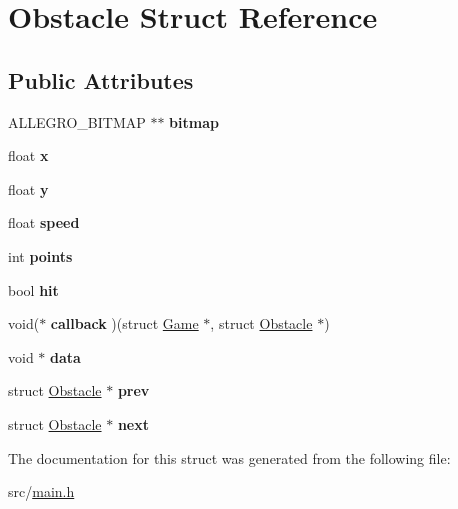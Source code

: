 \hypertarget{structObstacle}{\section{\-Obstacle \-Struct \-Reference}
\label{structObstacle}
}
\subsection*{\-Public \-Attributes}
\begin{DoxyCompactItemize}
\item 
\hypertarget{structObstacle_a1f35f88fe8f6d0664da082f82ae4b774}{\-A\-L\-L\-E\-G\-R\-O\-\_\-\-B\-I\-T\-M\-A\-P $\ast$$\ast$ {\bfseries bitmap}}\label{structObstacle_a1f35f88fe8f6d0664da082f82ae4b774}

\item 
\hypertarget{structObstacle_ad9cd25e0032f6692a4f93a057ccdfd85}{float {\bfseries x}}\label{structObstacle_ad9cd25e0032f6692a4f93a057ccdfd85}

\item 
\hypertarget{structObstacle_af4b6f012014e2fa5aef193330f70fdef}{float {\bfseries y}}\label{structObstacle_af4b6f012014e2fa5aef193330f70fdef}

\item 
\hypertarget{structObstacle_a1e2b46db05325273ce0fcba3550b5b2a}{float {\bfseries speed}}\label{structObstacle_a1e2b46db05325273ce0fcba3550b5b2a}

\item 
\hypertarget{structObstacle_a38a164a0e4d6f6508fb65c6eff39147f}{int {\bfseries points}}\label{structObstacle_a38a164a0e4d6f6508fb65c6eff39147f}

\item 
\hypertarget{structObstacle_ac89d025f4ad7c2f083d262c1bee4e851}{bool {\bfseries hit}}\label{structObstacle_ac89d025f4ad7c2f083d262c1bee4e851}

\item 
\hypertarget{structObstacle_a21b4ff0edaa2dc5394ff7a6328e48358}{void($\ast$ {\bfseries callback} )(struct \hyperlink{structGame}{\-Game} $\ast$, struct \hyperlink{structObstacle}{\-Obstacle} $\ast$)}\label{structObstacle_a21b4ff0edaa2dc5394ff7a6328e48358}

\item 
\hypertarget{structObstacle_a88728e624cc62993e2bf52aff816cdff}{void $\ast$ {\bfseries data}}\label{structObstacle_a88728e624cc62993e2bf52aff816cdff}

\item 
\hypertarget{structObstacle_a13bc07b730f58d5b1c3db68e8e4aca27}{struct \hyperlink{structObstacle}{\-Obstacle} $\ast$ {\bfseries prev}}\label{structObstacle_a13bc07b730f58d5b1c3db68e8e4aca27}

\item 
\hypertarget{structObstacle_a503bcadcc638d0e4dcd57cdc04cf1d42}{struct \hyperlink{structObstacle}{\-Obstacle} $\ast$ {\bfseries next}}\label{structObstacle_a503bcadcc638d0e4dcd57cdc04cf1d42}

\end{DoxyCompactItemize}


\-The documentation for this struct was generated from the following file\-:\begin{DoxyCompactItemize}
\item 
src/\hyperlink{main_8h}{main.\-h}\end{DoxyCompactItemize}
